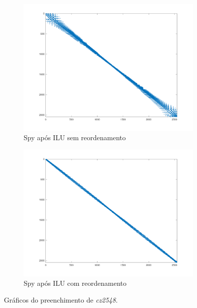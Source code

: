 \begin{figure}[H]
    \begin{subfigure}[t]{0.4\linewidth}
         \centering
         \includegraphics[width=\textwidth]{images/cz2548_spyM_ILU_sem.png}
         \caption{Spy após ILU sem reordenamento}
         \label{fig:cz-ILU-s}
    \end{subfigure}
    \quad
    \begin{subfigure}[t]{0.4\linewidth}
         \centering
         \includegraphics[width=\textwidth]{images/cz2548_spyM_ILU_com.png}
         \caption{Spy após ILU com reordenamento}
         \label{fig:cz-ILU-c}
    \end{subfigure}
    \caption{Gráficos do preenchimento de \textit{cz2548}.}
    \label{fig:cz}
\end{figure}
